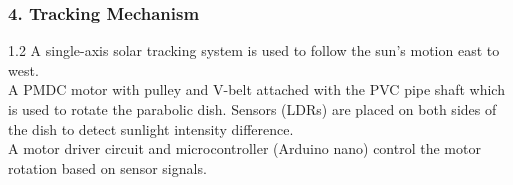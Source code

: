 \vspace{4mm}
\subsubsection*{4. Tracking Mechanism}
\noindent
\begin{spacing}{1.2}
{\fontsize{10.2}{14.5}\selectfont
A single-axis solar tracking system is used to follow the sun's motion east to west.\\[2.5mm]
A PMDC motor with pulley and V-belt attached with the PVC pipe shaft which is used to rotate the parabolic dish. Sensors (LDRs) are placed on both sides of the dish to detect sunlight intensity difference.\\[2.5mm]
A motor driver circuit and microcontroller (Arduino nano) control the motor rotation based on sensor signals.
}
\end{spacing}
\clearpage
